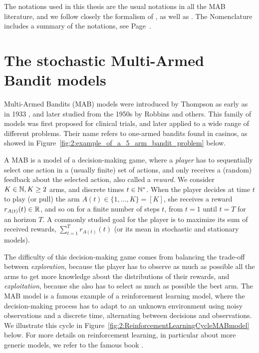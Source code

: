 The notations used in this thesis are the usual notations in all the MAB literature, and we follow closely the formalism of \cite{Kaufmann12PhD}, as well as \cite{Slivkins2019,LattimoreBanditAlgorithmsBook,Bubeck12}.
The Nomenclature includes a summary of the notations, see Page~\pageref{chapter:nomenclature}.




\section{The stochastic Multi-Armed Bandit models}
\label{sec:2:notations}


Multi-Armed Bandits (MAB) models were introduced by Thompson as early as in 1933 \cite{Thompson33}, and later studied from the 1950s by Robbins \cite{Robbins52} and others.
This family of models was first proposed for clinical trials, and later applied to a wide range of different problems.
Their name refers to one-armed bandits found in casinos, as showed in Figure~\ref{fig:2:example_of_a_5_arm_bandit_problem} below.


A MAB is a model of a decision-making game, where a \emph{player} has to sequentially select one action in a (usually finite) set of actions, and only receives a (random) feedback about the selected action, also called a \emph{reward}.
We consider $K\in\mathbb{N}, K\geq2$ arms, and discrete times $t\in\mathbb{N}^*$.
When the player decides at time $t$ to play (or pull) the arm $A(t)\in\{1,\dots,K\}=[K]$, she receives a reward $r_{A(t)}(t)\in\mathbb{R}$, and so on for a finite number of steps $t$, from $t=1$ until $t=T$ for an horizon $T$.
%
A commonly studied goal for the player is to maximize its sum of received rewards, $\sum_{t=1}^T r_{A(t)}(t)$
(or its mean in stochastic and stationary models).


The difficulty of this decision-making game comes from balancing the trade-off between \emph{exploration}, because the player has to observe as much as possible all the arms to get more knowledge about the distributions of their rewards, and \emph{exploitation}, because she also has to select as much as possible the best arm.
The MAB model is a famous example of a reinforcement learning model, where the decision-making process has to adapt to an unknown environment using noisy observations and a discrete time, alternating between decisions and observations.
We illustrate this cycle in Figure~\ref{fig:2:ReinforcementLearningCycleMABmodel} below.
For more details on reinforcement learning, in particular about more generic models, we refer to the famous book \cite{SuttonBarto2018}.


